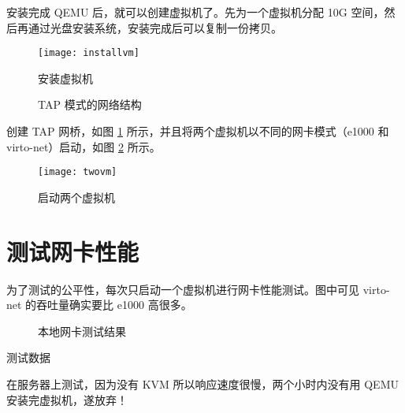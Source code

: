     安装完成 QEMU 后，就可以创建虚拟机了。先为一个虚拟机分配 10G 空间，然后再通过光盘安装系统，安装完成后可以复制一份拷贝。

    \begin{figure}[h]
        \centering
        \begin{minipage}{0.48\textwidth}
            \centering
            \texttt{[image: installvm]}
            \caption{安装虚拟机}\label{fig:installvm}
        \end{minipage}
        \begin{minipage}{0.48\textwidth}
            \centering
            
            \caption{TAP 模式的网络结构}\label{fig:tapnet}
        \end{minipage}
    \end{figure}


    创建 TAP 网桥\cite{tap}，如图 \ref{fig:tapnet} 所示，并且将两个虚拟机以不同的网卡模式（e1000 和 virto-net）启动，如图 \ref{fig:twovm} 所示。

    \begin{figure}[H]
        \centering
        \texttt{[image: twovm]}
        \caption{启动两个虚拟机}\label{fig:twovm}
    \end{figure}


    \section{测试网卡性能}

    为了测试的公平性，每次只启动一个虚拟机进行网卡性能测试。图中可见 virto-net 的吞吐量确实要比 e1000 高很多。
    

    \begin{minipage}{0.48\textwidth}
        \begin{figure}[H]
            \centering
            \caption{本地网卡测试结果}\label{fig:localtest}
        \end{figure}
    \end{minipage}\hfil
    \begin{minipage}{0.35\textwidth}
        \begin{table}[H]
            \caption{测试数据}\label{tab:localtest}
        \end{table}
    \end{minipage}\par

    \vspace*{1em}

    在服务器上测试，因为没有 KVM 所以响应速度很慢，两个小时内没有用 QEMU 安装完虚拟机，遂放弃！
        

    
